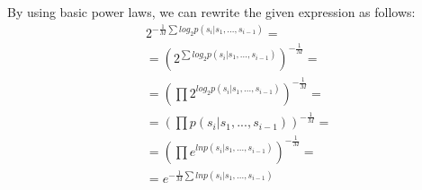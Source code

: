 By using basic power laws, we can rewrite the given expression as follows:
\begin{align*}
    &2^{-\frac{1}{M}\sum log_2 p(s_i | s_1,...,s_{i-1})}= \\
&= (2^{\sum log_2 p(s_i | s_1,...,s_{i-1})})^{-\frac{1}{M}}= \\
&= (\prod 2^{log_2 p(s_i | s_1,...,s_{i-1})})^{-\frac{1}{M}}= \\
&= (\prod p(s_i | s_1,...,s_{i-1}))^{-\frac{1}{M}}= \\
&= (\prod e^{ln p(s_i | s_1,...,s_{i-1})})^{-\frac{1}{M}}= \\
&= e^{-\frac{1}{M}\sum ln p(s_i | s_1,...,s_{i-1})}
\end{align*}